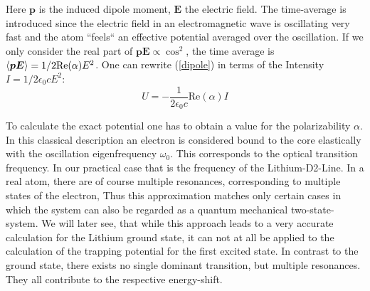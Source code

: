 Here $\boldsymbol{p}$ is the induced dipole moment, $\boldsymbol{E}$ the electric field. The time-average is introduced since the electric field in an electromagnetic wave is oscillating very fast and the atom “feels“ an effective potential averaged over the oscillation. If we only consider the real part of $\boldsymbol{p}\boldsymbol{E}\propto \cos^2$, the time average is $\left\langle \boldsymbol{p}\boldsymbol{E}\right\rangle=1/2 \mathrm{ Re}(\alpha)E^2$. One can rewrite (\ref{dipole}) in terms of the Intensity $I=1/2\epsilon_0cE^2 $:
\begin{equation}
U=-\frac{1}{2\epsilon_0 c}\mathrm{Re}(\alpha)I
\end{equation} 

To calculate the exact potential one has to obtain a value for the polarizability $\alpha$. In this classical description an electron is considered bound to the core elastically with the oscillation eigenfrequency $\omega_0$. This corresponds to the optical transition frequency. In our practical case that is the frequency of the Lithium-D2-Line. In a real atom, there are of course multiple resonances, corresponding to multiple states of the electron, Thus this approximation matches only  certain cases in which the system can also be regarded as a quantum mechanical two-state-system. We will later see, that while this approach leads to a very accurate calculation for the Lithium ground state, it can not at all be applied to the calculation of the trapping potential for the first excited state. In contrast to the ground state, there exists no single dominant transition, but multiple resonances. They all contribute to the respective energy-shift.

